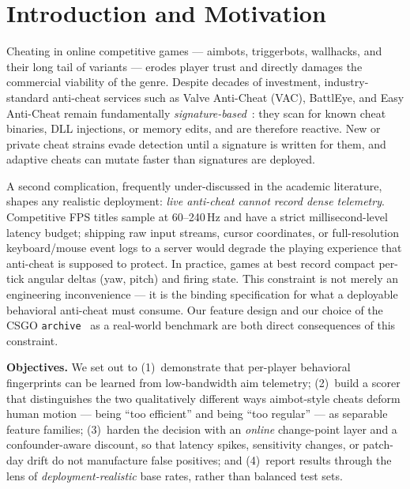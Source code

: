 \documentclass[conference,10pt]{IEEEtran}
\begin{document}
\section{Introduction and Motivation}

Cheating in online competitive games --- aimbots, triggerbots, wallhacks,
and their long tail of variants --- erodes player trust and directly
damages the commercial viability of the genre. Despite decades of
investment, industry-standard anti-cheat services such as Valve
Anti-Cheat (VAC), BattlEye, and Easy Anti-Cheat remain fundamentally
\emph{signature-based}~\cite{valve2018vac}: they scan for known cheat
binaries, DLL injections, or memory edits, and are therefore reactive.
New or private cheat strains evade detection until a signature is written
for them, and adaptive cheats can mutate faster than signatures are
deployed.

A second complication, frequently under-discussed in the academic
literature, shapes any realistic deployment: \emph{live anti-cheat cannot
record dense telemetry}. Competitive FPS titles sample at 60--240\,Hz
and have a strict millisecond-level latency budget; shipping raw input
streams, cursor coordinates, or full-resolution keyboard/mouse event
logs to a server would degrade the playing experience that anti-cheat
is supposed to protect. In practice, games at best record compact
per-tick angular deltas (yaw, pitch) and firing state. This constraint
is not merely an engineering inconvenience --- it is the binding
specification for what a deployable behavioral anti-cheat must consume.
Our feature design and our choice of the CSGO
\texttt{archive}~\cite{kaggle_csgoarchive} as a real-world benchmark are
both direct consequences of this constraint.

\textbf{Objectives.} We set out to (1)~demonstrate that per-player
behavioral fingerprints can be learned from low-bandwidth aim telemetry;
(2)~build a scorer that distinguishes the two qualitatively different
ways aimbot-style cheats deform human motion --- being ``too efficient''
and being ``too regular'' --- as separable feature families;
(3)~harden the decision with an \emph{online} change-point layer and a
confounder-aware discount, so that latency spikes, sensitivity changes,
or patch-day drift do not manufacture false positives; and (4)~report
results through the lens of \emph{deployment-realistic} base rates,
rather than balanced test sets.

\end{document}

